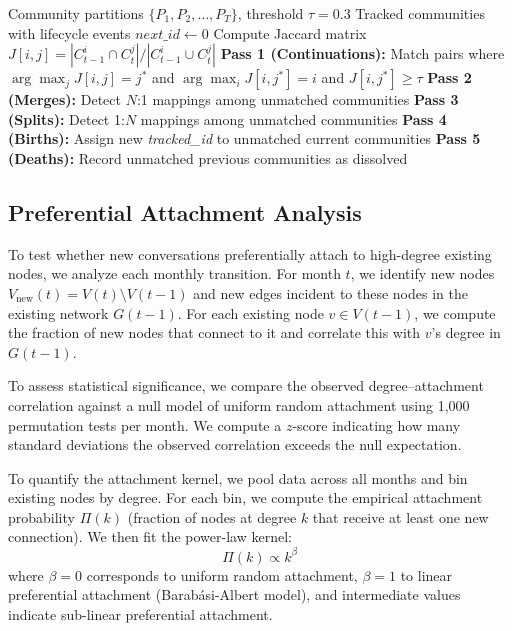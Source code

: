 \documentclass[10pt,letterpaper]{article}
\begin{document}
\begin{algorithm}[t]
\caption{Community Lifecycle Tracking via Jaccard Alignment}
\label{alg:community_tracking}
\begin{algorithmic}[1]
\Require Community partitions $\{P_1, P_2, \ldots, P_T\}$, threshold $\tau = 0.3$
\Ensure Tracked communities with lifecycle events
\State $\textit{next\_id} \gets 0$
  \State Compute Jaccard matrix $J[i,j] = |C_{t-1}^i \cap C_t^j| / |C_{t-1}^i \cup C_t^j|$
  \State \textbf{Pass 1 (Continuations):} Match pairs where $\arg\max_j J[i,j] = j^*$ and $\arg\max_i J[i,j^*] = i$ and $J[i,j^*] \geq \tau$
  \State \textbf{Pass 2 (Merges):} Detect $N$:1 mappings among unmatched communities
  \State \textbf{Pass 3 (Splits):} Detect 1:$N$ mappings among unmatched communities
  \State \textbf{Pass 4 (Births):} Assign new \textit{tracked\_id} to unmatched current communities
  \State \textbf{Pass 5 (Deaths):} Record unmatched previous communities as dissolved
\EndFor
\end{algorithmic}
\end{algorithm}


\subsection{Preferential Attachment Analysis}
\label{sec:pref_attach}

To test whether new conversations preferentially attach to high-degree existing nodes, we analyze each monthly transition. For month $t$, we identify new nodes $V_{\text{new}}(t) = V(t) \setminus V(t-1)$ and new edges incident to these nodes in the existing network $G(t-1)$. For each existing node $v \in V(t-1)$, we compute the fraction of new nodes that connect to it and correlate this with $v$'s degree in $G(t-1)$.

To assess statistical significance, we compare the observed degree--attachment correlation against a null model of uniform random attachment using 1{,}000 permutation tests per month. We compute a $z$-score indicating how many standard deviations the observed correlation exceeds the null expectation.

To quantify the attachment kernel, we pool data across all months and bin existing nodes by degree. For each bin, we compute the empirical attachment probability $\Pi(k)$ (fraction of nodes at degree $k$ that receive at least one new connection). We then fit the power-law kernel:
\begin{equation}
  \Pi(k) \propto k^\beta
  \label{eq:attachment_kernel}
\end{equation}
where $\beta = 0$ corresponds to uniform random attachment, $\beta = 1$ to linear preferential attachment (Barab\'asi-Albert model), and intermediate values indicate sub-linear preferential attachment.
\end{document}
